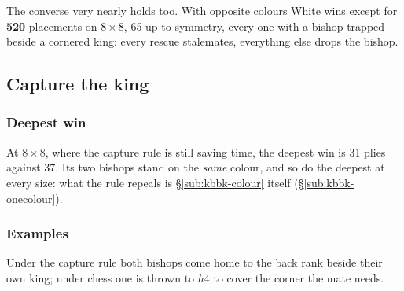 \documentclass[10pt]{article}
\begin{document}
\medskip
\noindent
\begin{minipage}[t]{0.36\textwidth}
\end{minipage}\hfill
\begin{minipage}[t]{0.36\textwidth}
\end{minipage}\hfill
\begin{minipage}[t]{0.24\textwidth}\vspace{0pt}\small
The converse very nearly holds too. With opposite colours White wins except for
\textbf{520} placements on $8\times8$, 65 up to symmetry, every one with a
bishop trapped beside a cornered king: every rescue stalemates, everything else
drops the bishop.
\end{minipage}

\subsection{Capture the king}\label{sub:kbbk-capture}

\subsubsection{Deepest win}\label{sub:kbbk-cap-law}

\noindent
At $8\times8$, where the capture rule is still saving time, the deepest win is
31 plies against 37. Its two bishops stand on the \emph{same} colour, and so do
the deepest at every size: what the rule repeals is \S\ref{sub:kbbk-colour}
itself (\S\ref{sub:kbbk-onecolour}).

\subsubsection{Examples}\label{sub:kbbk-cap-pos}

\medskip
\noindent
\begin{minipage}[t]{0.32\textwidth}
\end{minipage}\hfill
\begin{minipage}[t]{0.32\textwidth}
\end{minipage}\hfill
\begin{minipage}[t]{0.32\textwidth}\vspace{0pt}\small
Under the capture rule both bishops come home to the back rank beside their own
king; under chess one is thrown to $h4$ to cover the corner the mate needs.
\end{minipage}
\end{document}
